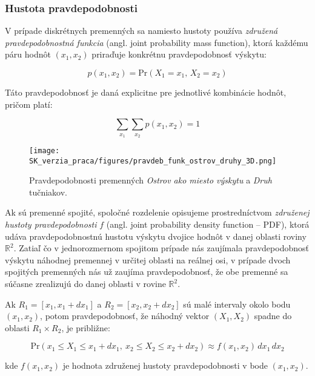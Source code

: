 \subsubsection{Hustota pravdepodobnosti}\label{subsec:joint_pdf}

V prípade diskrétnych premenných sa namiesto hustoty používa \textit{združená pravdepodobnostná funkcia} (angl. joint probability mass function), ktorá každému páru hodnôt $(x_1, x_2)$ priraďuje konkrétnu pravdepodobnosť výskytu: 

\begin{equation}
p(x_1, x_2) = \mathrm{Pr}(X_1 = x_1,\, X_2 = x_2)
\end{equation}

Táto pravdepodobnosť je daná explicitne pre jednotlivé kombinácie hodnôt, pričom platí:

\begin{equation}
\sum_{x_1} \sum_{x_2} p(x_1, x_2) = 1
\end{equation}

\begin{figure}[H]
    \centering
    \texttt{[image: SK\_verzia\_praca/figures/pravdeb\_funk\_ostrov\_druhy\_3D.png]}
    \caption{Pravdepodobnosti premenných \textit{Ostrov ako miesto výskytu} a \textit{Druh} tučniakov.}
    \label{fig:miesto_druh_joint_density}
\end{figure}

Ak sú premenné spojité, spoločné rozdelenie opisujeme prostredníctvom \textit{združenej hustoty pravdepodobnosti} $f$ (angl. joint probability density function – PDF), ktorá udáva pravdepodobnostnú hustotu výskytu dvojice hodnôt v danej oblasti roviny $\mathbb{R}^2$.
Zatiaľ čo v jednorozmernom spojitom prípade nás zaujímala pravdepodobnosť výskytu náhodnej premennej v určitej oblasti na reálnej osi, v prípade dvoch spojitých premenných nás už zaujíma pravdepodobnosť, že obe premenné sa súčasne zrealizujú do danej oblasti v rovine $\mathbb{R}^2$.

Ak $R_1 = [x_1, x_1 + dx_1]$ a $R_2 = [x_2, x_2 + dx_2]$ sú malé intervaly okolo bodu $(x_1, x_2)$, potom pravdepodobnosť, že náhodný vektor $(X_1, X_2)$ spadne do oblasti $R_1 \times R_2$, je približne:

\begin{equation}
\mathrm{Pr}(x_1 \leq X_1 \leq x_1 + dx_1,\ x_2 \leq X_2 \leq x_2 + dx_2) \approx f(x_1, x_2) \, dx_1 \, dx_2
\end{equation}

kde $f(x_1, x_2)$ je hodnota združenej hustoty pravdepodobnosti v bode $(x_1, x_2)$.

